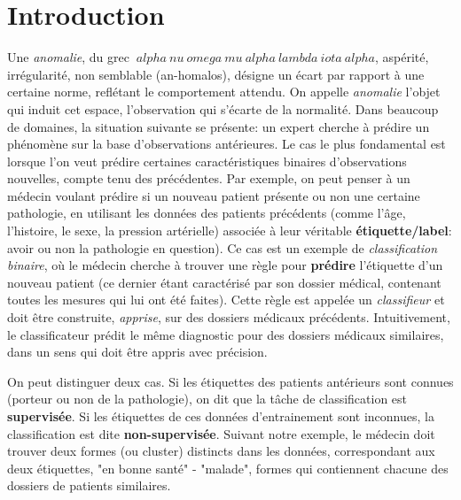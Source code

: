 \section{Introduction}
Une \emph{anomalie}, du grec $\ alpha \ nu \ omega \ mu \ alpha \ lambda \ iota \ alpha $, aspérité, irrégularité, non semblable (an-homalos), désigne un écart par rapport à une certaine norme, reflétant le comportement attendu.
On appelle \emph {anomalie} l'objet qui induit cet espace, l'observation qui s'écarte de la normalité.
%
Dans beaucoup de domaines, la situation suivante se présente: un expert cherche à prédire un phénomène sur la base d'observations antérieures. Le cas le plus fondamental est lorsque l'on veut prédire certaines caractéristiques binaires d'observations nouvelles, compte tenu des précédentes. Par exemple, on peut penser à un médecin voulant prédire si un nouveau patient présente ou non une certaine pathologie, en utilisant les données des patients précédents (comme l'âge, l'histoire, le sexe, la pression artérielle) associée à leur véritable \textbf{étiquette/label}: avoir ou non la pathologie en question). Ce cas est un exemple de \emph {classification binaire}, où le médecin cherche à trouver une règle pour \textbf {prédire} l'étiquette d'un nouveau patient (ce dernier étant caractérisé par son dossier médical, contenant toutes les mesures qui lui ont été faites). Cette règle est appelée un \emph{classifieur} et doit être construite, \emph{apprise}, sur des dossiers médicaux précédents. %
Intuitivement, le classificateur prédit le même diagnostic pour des dossiers médicaux similaires, dans un sens qui doit être appris avec précision.

On peut distinguer deux cas. Si les étiquettes des patients antérieurs sont connues (porteur ou non de la pathologie), on dit que la tâche de classification est \textbf {supervisée}. Si les étiquettes de ces données d'entrainement sont inconnues, la classification est dite \textbf {non-supervisée}. Suivant notre exemple, le médecin doit trouver deux formes (ou cluster) distincts dans les données, correspondant aux deux étiquettes, "en bonne santé" - "malade", formes qui contiennent chacune des dossiers de patients similaires.

